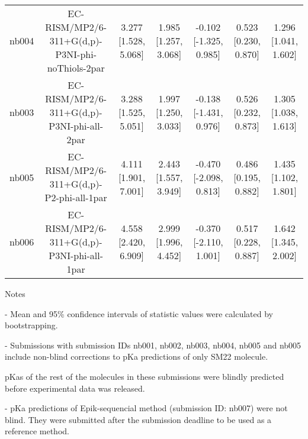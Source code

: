 \documentclass{article}
\begin{document}
\begin{center}
\begin{longtable}{|ccccccc|}
 nb004 &    EC-RISM/MP2/6-311+G(d,p)-P3NI-phi-noThiols-2par &  3.277 [1.528, 5.068] &  1.985 [1.257, 3.068] &   -0.102 [-1.325, 0.985] &  0.523 [0.230, 0.870] &   1.296 [1.041, 1.602] \\
 nb003 &         EC-RISM/MP2/6-311+G(d,p)-P3NI-phi-all-2par &  3.288 [1.525, 5.051] &  1.997 [1.250, 3.033] &   -0.138 [-1.431, 0.976] &  0.526 [0.232, 0.873] &   1.305 [1.038, 1.613] \\
 nb005 &           EC-RISM/MP2/6-311+G(d,p)-P2-phi-all-1par &  4.111 [1.901, 7.001] &  2.443 [1.557, 3.949] &   -0.470 [-2.098, 0.813] &  0.486 [0.195, 0.882] &   1.435 [1.102, 1.801] \\
 nb006 &         EC-RISM/MP2/6-311+G(d,p)-P3NI-phi-all-1par &  4.558 [2.420, 6.909] &  2.999 [1.996, 4.452] &   -0.370 [-2.110, 1.001] &  0.517 [0.228, 0.887] &   1.642 [1.345, 2.002] \\
\end{longtable}
\end{center}

Notes

- Mean and 95\% confidence intervals of statistic values were calculated by bootstrapping.

- Submissions with submission IDs nb001, nb002, nb003, nb004, nb005 and nb005 include non-blind corrections to pKa predictions of only SM22 molecule.

pKas of the rest of the molecules in these submissions were blindly predicted before experimental data was released.

- pKa predictions of Epik-sequencial method (submission ID: nb007) were not blind. They were submitted after the submission deadline to be used as a reference method.
\end{document}

